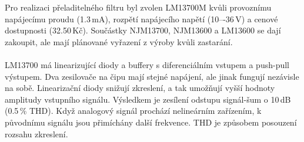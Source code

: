 \begin{center}
\begin{table}[h]
  \caption[Porovnání integrovaných obvodů se dvěma OTA]{\label{tab:Porovnání IC se dvěma OTA}Porovnání IC se dvěma OTA \cite{18}}
  \end{table}
\end{center}
\noindent Pro realizaci přeladitelného filtru byl zvolen LM13700M kvůli provoznímu napájecímu proudu (1.3\,mA), rozpětí napájecího napětí (10–-36\,V) a cenové dostupnosti (32.50\,Kč). Součástky NJM13700, NJM13600 a LM13600 se dají zakoupit, ale mají plánované vyřazení z výroby kvůli zastarání. \\
\\
LM13700 má linearizující diody a buffery s diferenciálním vstupem a push-pull výstupem. Dva zesilovače na čipu mají stejné napájení, ale jinak fungují nezávisle na sobě. Linearizační diody snižují zkreslení, a tak umožňují vyšší hodnoty amplitudy vstupního signálu. Výsledkem je zesílení odstupu signál-šum o 10\,dB (0.5\,\% THD). Když analogový signál prochází nelineárním zařízením, k původnímu signálu jsou přimíchány další frekvence. THD je způsobem posouzení rozsahu zkreslení.\\

